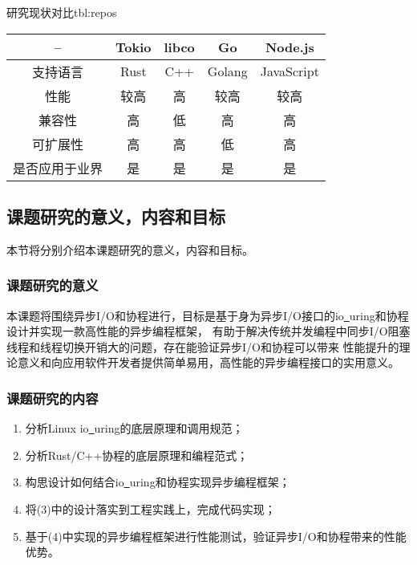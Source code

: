 \documentclass[supercite]{HustGraduPaper}
\theoremstyle{definition}
\begin{document}
\begin{generaltab}{研究现状对比}{tbl:repos}
  \begin{tabular}{c|cccc}
    \toprule
    -- & Tokio & libco & Go & Node.js \\
    \midrule
    支持语言 & Rust & C++ & Golang & JavaScript \\
    性能 & 较高 & 高 & 较高 & 较高 \\
    兼容性 & 高 & 低 & 高 & 高 \\
    可扩展性 & 高 & 高 & 低 & 高 \\
    是否应用于业界 & 是 & 是 & 是 & 是 \\
    \bottomrule
  \end{tabular}
\end{generaltab}
\subsection{课题研究的意义，内容和目标}

本节将分别介绍本课题研究的意义，内容和目标。\par

\subsubsection{课题研究的意义}
本课题将围绕异步I/O和协程进行，目标是基于身为异步I/O接口的io\underline{~}uring和协程
设计并实现一款高性能的异步编程框架，
有助于解决传统并发编程中同步I/O阻塞线程和线程切换开销大的问题，存在能验证异步I/O和协程可以带来
性能提升的理论意义和向应用软件开发者提供简单易用，高性能的异步编程接口的实用意义。\par

\subsubsection{课题研究的内容}
\begin{enumerate}[label={(\arabic*)}]
  \item 分析Linux io\underline{~}uring的底层原理和调用规范；
  \item 分析Rust/C++协程的底层原理和编程范式；
  \item 构思设计如何结合io\underline{~}uring和协程实现异步编程框架；
  \item 将(3)中的设计落实到工程实践上，完成代码实现；
  \item 基于(4)中实现的异步编程框架进行性能测试，验证异步I/O和协程带来的性能优势。
\end{enumerate}
\end{document}
